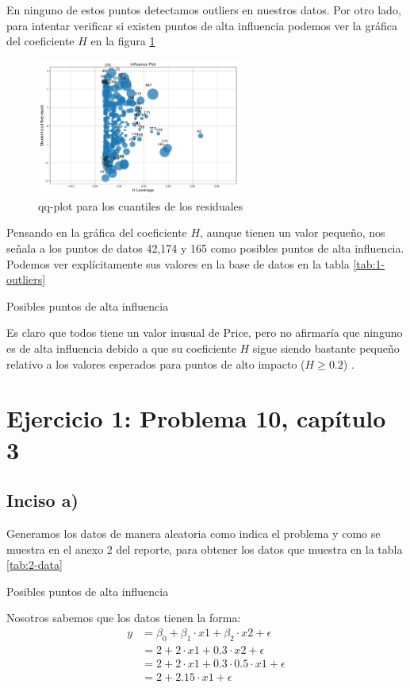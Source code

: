 \documentclass[11pt]{article}
\begin{document}
En ninguno de estos puntos detectamos outliers en nuestros datos. Por otro lado, para intentar verificar si existen puntos de alta influencia podemos ver la gráfica del coeficiente $H$ en la figura \ref{fig:1-influence}
\begin{figure}[H]
    \centering
    \includegraphics[width = 0.6\textwidth]{1-influence.pdf}
    \caption{qq-plot para los cuantiles de los residuales}
    \label{fig:1-influence}
\end{figure}
Pensando en la gráfica del coeficiente $H$, aunque tienen un valor pequeño, nos señala a los puntos de datos 42,174 y 165 como posibles puntos de alta influencia. Podemos ver explícitamente sus valores en la base de datos en la tabla \ref{tab:1-outliers}
\begin{table}[H]
    
    \caption{Posibles puntos de alta influencia}
    \label{tab:1-outliers}
\end{table}
Es claro que todos tiene un valor inusual de Price, pero no afirmaría que ninguno es de alta influencia debido a que  su coeficiente $H$ sigue siendo bastante pequeño relativo a los valores esperados para puntos de alto impacto ($H \geq 0.2$) \cite{isl}.
\section{Ejercicio 1: Problema 10, capítulo 3 \cite{isl}}
\subsection{Inciso a)}
Generamos los datos de manera aleatoria como indica el problema y como se muestra en el anexo 2 del reporte, para obtener los datos que muestra en la tabla \ref{tab:2-data}
\begin{table}[H]
    \centering
    
    \caption{Posibles puntos de alta influencia}
    \label{tab:2-data}
\end{table}
Nosotros sabemos que los datos tienen la forma:
\begin{equation}
    \label{2-mod}
    \begin{split}
        y &= \beta_0 + \beta_1 \cdot x1 + \beta_2 \cdot x2 + \epsilon \\
         &= 2 + 2 \cdot x1 + 0.3 \cdot x2 + \epsilon \\
         &= 2 + 2 \cdot x1 + 0.3 \cdot 0.5 \cdot x1 + \epsilon \\
         &= 2 + 2.15 \cdot x1 + \epsilon \\
    \end{split}
\end{equation}
\end{document}
